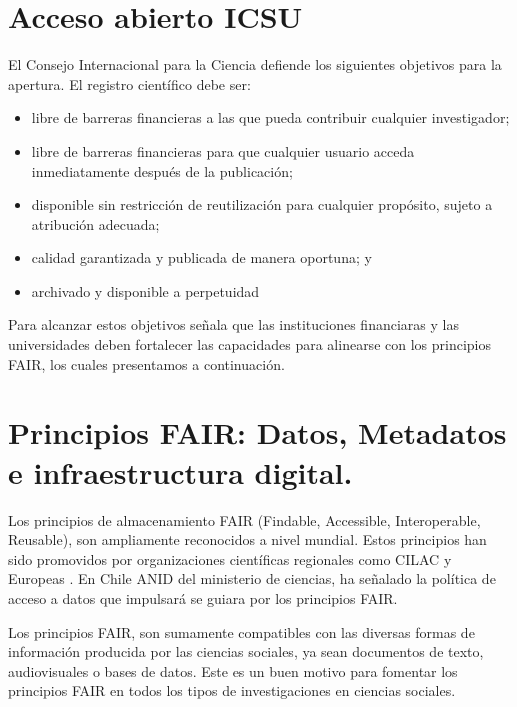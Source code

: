 \documentclass[
  14pt,
]{book}
\begin{document}
\hypertarget{acceso-abierto-icsu}{%
\section{Acceso abierto ICSU}\label{acceso-abierto-icsu}}

El Consejo Internacional para la Ciencia \citep{icsu_Open_2014} defiende los siguientes objetivos para la apertura. El registro científico debe ser:

\begin{itemize}
\item
  libre de barreras financieras a las que pueda contribuir cualquier investigador;
\item
  libre de barreras financieras para que cualquier usuario acceda inmediatamente después de la publicación;
\item
  disponible sin restricción de reutilización para cualquier propósito, sujeto a
  atribución adecuada;
\item
  calidad garantizada y publicada de manera oportuna; y
\item
  archivado y disponible a perpetuidad
\end{itemize}

Para alcanzar estos objetivos \citet{ics_Open_2020} señala que las instituciones financiaras y las universidades deben fortalecer las capacidades para alinearse con los principios FAIR, los cuales presentamos a continuación.

\hypertarget{principios-fair-datos-metadatos-e-infraestructura-digital.}{%
\section{Principios FAIR: Datos, Metadatos e infraestructura digital.}\label{principios-fair-datos-metadatos-e-infraestructura-digital.}}

Los principios de almacenamiento FAIR (Findable, Accessible, Interoperable, Reusable), son ampliamente reconocidos a nivel mundial. Estos principios han sido promovidos por organizaciones científicas regionales como CILAC \citep{ramirez_Ciencia_2019} y Europeas \citep{ec_FAIR_2016}. En Chile ANID del ministerio de ciencias, ha señalado la política de acceso a datos que impulsará se guiara por los principios FAIR.

Los principios FAIR, son sumamente compatibles con las diversas formas de información producida por las ciencias sociales, ya sean documentos de texto, audiovisuales o bases de datos. Este es un buen motivo para fomentar los principios FAIR en todos los tipos de investigaciones en ciencias sociales.
\end{document}
